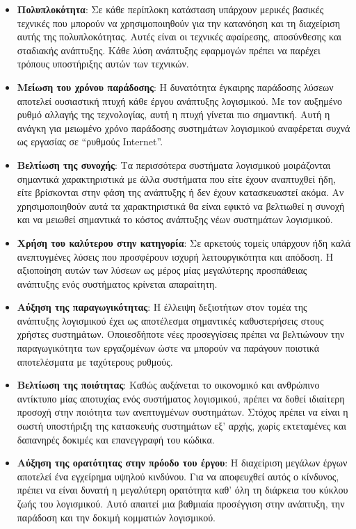 \begin{itemize}
	\item{\textbf{Πολυπλοκότητα}: Σε κάθε περίπλοκη κατάσταση υπάρχουν μερικές βασικές τεχνικές που μπορούν να χρησιμοποιηθούν για την κατανόηση και τη διαχείριση αυτής της πολυπλοκότητας. Αυτές είναι οι τεχνικές αφαίρεσης, αποσύνθεσης και σταδιακής ανάπτυξης. Κάθε λύση ανάπτυξης εφαρμογών πρέπει να παρέχει τρόπους υποστήριξης αυτών των τεχνικών.}
	\item{\textbf{Μείωση του χρόνου παράδοσης}: Η δυνατότητα έγκαιρης παράδοσης λύσεων αποτελεί ουσιαστική πτυχή κάθε έργου ανάπτυξης λογισμικού. Με τον αυξημένο ρυθμό αλλαγής της τεχνολογίας, αυτή η πτυχή γίνεται πιο σημαντική. Αυτή η ανάγκη για μειωμένο χρόνο παράδοσης συστημάτων λογισμικού αναφέρεται συχνά ως εργασίας σε “ρυθμούς Internet”.}
	\item{\textbf{Βελτίωση της συνοχής}: Τα περισσότερα συστήματα λογισμικού μοιράζονται σημαντικά χαρακτηριστικά με άλλα συστήματα που είτε έχουν αναπτυχθεί ήδη, είτε βρίσκονται στην φάση της ανάπτυξης ή δεν έχουν κατασκευαστεί ακόμα. Αν χρησιμοποιηθούν αυτά τα χαρακτηριστικά θα είναι εφικτό να βελτιωθεί η συνοχή και να μειωθεί σημαντικά το κόστος ανάπτυξης νέων συστημάτων λογισμικού. }
	\item{\textbf{Χρήση του καλύτερου στην κατηγορία}: Σε αρκετούς τομείς υπάρχουν ήδη καλά ανεπτυγμένες λύσεις που προσφέρουν ισχυρή λειτουργικότητα και απόδοση. Η αξιοποίηση αυτών των λύσεων ως μέρος μίας μεγαλύτερης προσπάθειας ανάπτυξης ενός συστήματος κρίνεται απαραίτητη. }
	\item{\textbf{Αύξηση της παραγωγικότητας}: Η έλλειψη δεξιοτήτων στον τομέα της ανάπτυξης λογισμικού έχει ως αποτέλεσμα σημαντικές καθυστερήσεις στους χρήστες συστημάτων. Οποιεσδήποτε νέες προσεγγίσεις πρέπει να βελτιώνουν την παραγωγικότητα των εργαζομένων ώστε να μπορούν να παράγουν ποιοτικά αποτελέσματα με ταχύτερους ρυθμούς. }
	\item{\textbf{Βελτίωση της ποιότητας}: Καθώς αυξάνεται το οικονομικό και ανθρώπινο αντίκτυπο μίας αποτυχίας ενός συστήματος λογισμικού, πρέπει να δοθεί ιδιαίτερη προσοχή στην ποιότητα των ανεπτυγμένων συστημάτων. Στόχος πρέπει να είναι η σωστή υποστήριξη της κατασκευής συστημάτων εξ’ αρχής, χωρίς εκτεταμένες και δαπανηρές δοκιμές και επανεγγραφή του κώδικα. }
	\item{\textbf{Αύξηση της ορατότητας στην πρόοδο του έργου}: Η διαχείριση μεγάλων έργων αποτελεί ένα εγχείρημα υψηλού κινδύνου. Για να αποφευχθεί αυτός ο κίνδυνος, πρέπει να είναι δυνατή η μεγαλύτερη ορατότητα καθ’ όλη τη διάρκεια του κύκλου ζωής του λογισμικού. Αυτό απαιτεί μια βαθμιαία προσέγγιση στην ανάπτυξη, την παράδοση και την δοκιμή κομματιών λογισμικού. }

\end{itemize}

